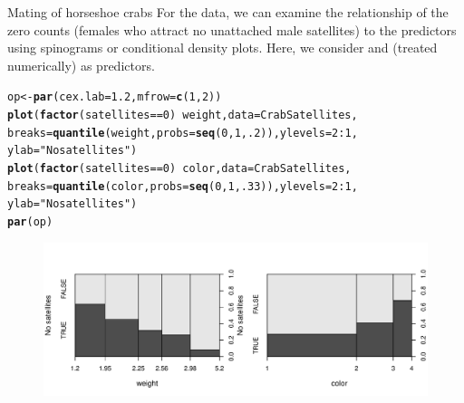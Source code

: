 \documentclass[11pt]{book}\usepackage[]{graphicx}\usepackage[]{color}
\makeatletter
\newcommand{\hlnum}[1]{\textcolor[rgb]{0.686,0.059,0.569}{#1}}%
\newcommand{\hlstr}[1]{\textcolor[rgb]{0.192,0.494,0.8}{#1}}%
\newcommand{\hlopt}[1]{\textcolor[rgb]{0,0,0}{#1}}%
\newcommand{\hlstd}[1]{\textcolor[rgb]{0.345,0.345,0.345}{#1}}%
\newcommand{\hlkwb}[1]{\textcolor[rgb]{0.69,0.353,0.396}{#1}}%
\newcommand{\hlkwc}[1]{\textcolor[rgb]{0.333,0.667,0.333}{#1}}%
\newcommand{\hlkwd}[1]{\textcolor[rgb]{0.737,0.353,0.396}{\textbf{#1}}}%
\newenvironment{kframe}{%
 \def\at@end@of@kframe{}%
 \ifinner\ifhmode%
  \def\at@end@of@kframe{\end{minipage}}%
  \begin{minipage}{\columnwidth}%
 \fi\fi%
 \def\FrameCommand##1{\hskip\@totalleftmargin \hskip-\fboxsep
 \colorbox{shadecolor}{##1}\hskip-\fboxsep
     \hskip-\linewidth \hskip-\@totalleftmargin \hskip\columnwidth}%
 \MakeFramed {\advance\hsize-\width
   \@totalleftmargin\z@ \linewidth\hsize
   \@setminipage}}%
 {\par\unskip\endMakeFramed%
 \at@end@of@kframe}
\newenvironment{knitrout}{}{} %
\renewenvironment{knitrout}{\small\renewcommand{\baselinestretch}{.85}}{} %
\makeatother
\begin{document}
\begin{Example}{Mating of horseshoe crabs}
For the  data, we can examine the relationship of the zero counts
(females who attract no unattached male satellites) to the predictors using spinograms
or conditional density plots.  Here, we consider  and  (treated numerically) as
predictors. 




\begin{knitrout}
\color{fgcolor}\begin{kframe}
\begin{alltt}
\hlstd{op} \hlkwb{<-} \hlkwd{par}\hlstd{(}\hlkwc{cex.lab}\hlstd{=}\hlnum{1.2}\hlstd{,} \hlkwc{mfrow} \hlstd{=} \hlkwd{c}\hlstd{(}\hlnum{1}\hlstd{,} \hlnum{2}\hlstd{))}
\hlkwd{plot}\hlstd{(}\hlkwd{factor}\hlstd{(satellites} \hlopt{==} \hlnum{0}\hlstd{)} \hlopt{~} \hlstd{weight,} \hlkwc{data} \hlstd{= CrabSatellites,}
     \hlkwc{breaks} \hlstd{=} \hlkwd{quantile}\hlstd{(weight,} \hlkwc{probs}\hlstd{=}\hlkwd{seq}\hlstd{(}\hlnum{0}\hlstd{,}\hlnum{1}\hlstd{,}\hlnum{.2}\hlstd{)),} \hlkwc{ylevels}\hlstd{=}\hlnum{2}\hlopt{:}\hlnum{1}\hlstd{,}
     \hlkwc{ylab}\hlstd{=}\hlstr{"No satellites"}\hlstd{)}
\hlkwd{plot}\hlstd{(}\hlkwd{factor}\hlstd{(satellites} \hlopt{==} \hlnum{0}\hlstd{)} \hlopt{~} \hlstd{color,} \hlkwc{data} \hlstd{= CrabSatellites,}
     \hlkwc{breaks} \hlstd{=} \hlkwd{quantile}\hlstd{(color,} \hlkwc{probs}\hlstd{=}\hlkwd{seq}\hlstd{(}\hlnum{0}\hlstd{,}\hlnum{1}\hlstd{,}\hlnum{.33}\hlstd{)),}  \hlkwc{ylevels}\hlstd{=}\hlnum{2}\hlopt{:}\hlnum{1}\hlstd{,}
     \hlkwc{ylab}\hlstd{=}\hlstr{"No satellites"}\hlstd{)}
\hlkwd{par}\hlstd{(op)}
\end{alltt}
\end{kframe}\begin{figure}[!htbp]


\centerline{\includegraphics[width=\textwidth]{ch09/fig/crabs-zero-spinogram} }


\end{figure}
\end{knitrout}
\end{Example}
\end{document}
